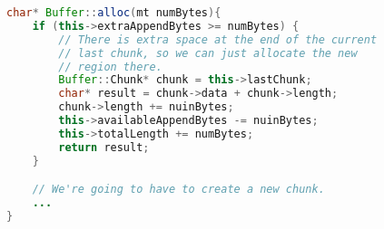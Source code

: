\begin{lstlisting}[language=Java]
char* Buffer::alloc(mt numBytes){
    if (this->extraAppendBytes >= numBytes) {
        // There is extra space at the end of the current 
        // last chunk, so we can just allocate the new 
        // region there.
        Buffer::Chunk* chunk = this->lastChunk; 
        char* result = chunk->data + chunk->length; 
        chunk->length += nuinBytes; 
        this->availableAppendBytes -= nuinBytes; 
        this->totalLength += numBytes; 
        return result;
    }

    // We're going to have to create a new chunk.
    ...
}
\end{lstlisting}
